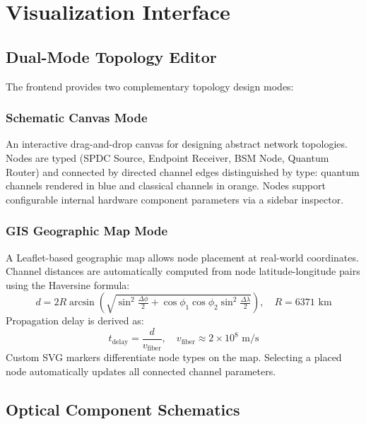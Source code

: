 \documentclass[12pt,oneside,letterpaper,english]{article}
\begin{document}
\section{Visualization Interface}

\subsection{Dual-Mode Topology Editor}

The frontend provides two complementary topology design modes:

\subsubsection{Schematic Canvas Mode}
An interactive drag-and-drop canvas for designing abstract network topologies. Nodes are typed (SPDC Source, Endpoint Receiver, BSM Node, Quantum Router) and connected by directed channel edges distinguished by type: quantum channels rendered in blue and classical channels in orange. Nodes support configurable internal hardware component parameters via a sidebar inspector.

\subsubsection{GIS Geographic Map Mode}
A Leaflet-based geographic map allows node placement at real-world coordinates. Channel distances are automatically computed from node latitude-longitude pairs using the Haversine formula:
\begin{equation}
    d = 2R\arcsin\!\left(\sqrt{\sin^2\!\tfrac{\Delta\phi}{2} + \cos\phi_1\cos\phi_2\sin^2\!\tfrac{\Delta\lambda}{2}}\right), \quad R = 6371\text{ km}
    \label{eq:haversine}
\end{equation}
Propagation delay is derived as:
\begin{equation}
    t_{\text{delay}} = \frac{d}{v_{\text{fiber}}}, \quad v_{\text{fiber}} \approx 2 \times 10^8 \text{ m/s}
    \label{eq:delay}
\end{equation}
Custom SVG markers differentiate node types on the map. Selecting a placed node automatically updates all connected channel parameters.

\subsection{Optical Component Schematics}
\end{document}
